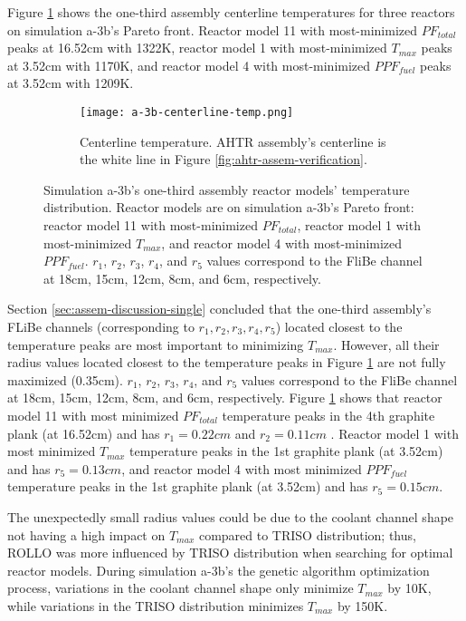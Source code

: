 Figure \ref{fig:a-3b-centerline-temp} shows the one-third assembly centerline 
temperatures for three reactors on simulation a-3b's Pareto front. 
Reactor model 11 with most-minimized $PF_{total}$ peaks at 16.52cm with 1322K, 
reactor model 1 with most-minimized $T_{max}$ peaks at 3.52cm with 1170K, 
and reactor model 4 with most-minimized $PPF_{fuel}$ peaks at 3.52cm with 1209K.
\begin{figure}[htbp!]
    \begin{subfigure}{\textwidth}
        \centering
        \texttt{[image: a-3b-centerline-temp.png]}
        \caption{Centerline temperature. AHTR assembly's centerline is the white line 
        in Figure \ref{fig:ahtr-assem-verification}.}
        \label{fig:a-3b-centerline-temp} 
    \end{subfigure}
    \caption{Simulation a-3b's one-third assembly reactor models' temperature 
    distribution. Reactor models are on simulation a-3b's Pareto front: 
    reactor model 11 with most-minimized $PF_{total}$, 
    reactor model 1 with most-minimized $T_{max}$, and
    reactor model 4 with most-minimized $PPF_{fuel}$. 
    $r_1$, $r_2$, $r_3$, $r_4$, and $r_5$ values correspond to the FliBe channel at 18cm, 
    15cm, 12cm, 8cm, and 6cm, respectively.  }
    \label{fig:a-3b-temp-distribution}
\end{figure}
Section \ref{sec:assem-discussion-single} concluded that the one-third assembly's 
FLiBe channels (corresponding to $r_1, r_2, r_3, r_4, r_5$) located closest to the 
temperature peaks are most important to minimizing $T_{max}$. 
However, all their radius values located closest to the temperature peaks in Figure 
\ref{fig:a-3b-centerline-temp} are not fully maximized (0.35cm). 
$r_1$, $r_2$, $r_3$, $r_4$, and $r_5$ values correspond to the FliBe channel at 18cm, 
15cm, 12cm, 8cm, and 6cm, respectively. 
Figure \ref{fig:a-3b-centerline-temp} shows that reactor model 11 with most minimized 
$PF_{total}$ temperature peaks in the 4th graphite plank (at 16.52cm) and 
has $r_1 = 0.22cm$ and $r_2 = 0.11cm$ . Reactor model 1 with most minimized 
$T_{max}$ temperature peaks in the 1st graphite plank (at 3.52cm) and has 
$r_5 = 0.13cm$, and reactor model 4 with most minimized $PPF_{fuel}$ temperature 
peaks in the 1st graphite plank (at 3.52cm) and has $r_5 = 0.15cm$. 

The unexpectedly small radius values could be due to the coolant channel shape not 
having a high impact on $T_{max}$ compared to TRISO distribution; thus, 
\gls{ROLLO} was more influenced by TRISO distribution when searching for optimal 
reactor models. 
During simulation a-3b's the genetic algorithm optimization process, 
variations in the coolant channel shape only minimize $T_{max}$ by 10K, while
variations in the TRISO distribution minimizes $T_{max}$ by 150K. 


